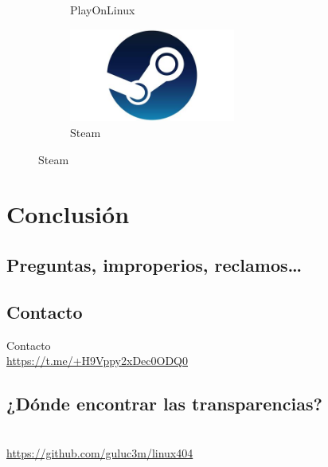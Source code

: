 \documentclass[aspectratio=43]{beamer}
\begin{document}
\begin{frame}{\secname}{\subsecname}
\begin{figure}
\begin{subfigure}{.4\textwidth}
                \caption*{PlayOnLinux}
            \end{subfigure}
            \pause
            \begin{subfigure}{.4\textwidth}
                \centering
                \includegraphics[width=0.6\textwidth]{img/steam.png}
                \caption*{Steam}
            \end{subfigure}
        \end{figure}
    \end{frame}

    \section{Conclusión}
    \subsection{Preguntas, improperios, reclamos\ldots}
    \begin{frame}[plain]{\subsecname}
    \end{frame}
    \subsection{Contacto}
    \begin{frame}{Contacto}
        \centering{}
        \hphantom{}\\
        \url{https://t.me/+H9Vppy2xDec0ODQ0}
    \end{frame}
    \subsection{¿Dónde encontrar las transparencias?}
    \begin{frame}[plain]{\subsecname}
        \centering{}
        \hphantom{}\\
        \url{https://github.com/guluc3m/linux404}
    \end{frame}
\end{document}
